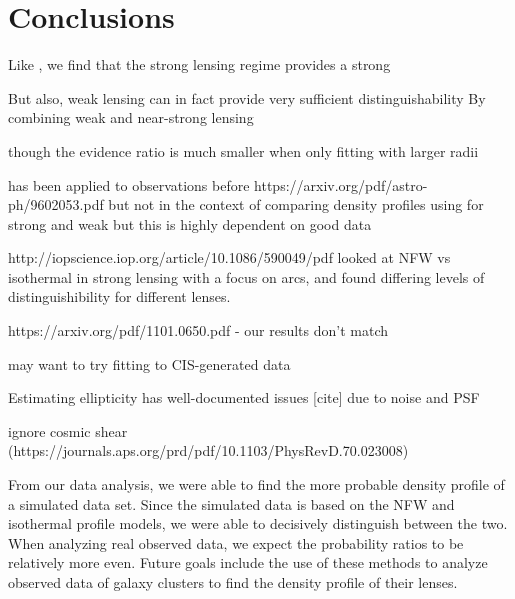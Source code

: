 \documentclass[10pt]{article}
\begin{document}
\section{Conclusions}

Like \citet{Shu2008}, we find that the strong lensing regime provides a strong

But also, weak lensing can in fact provide very sufficient distinguishability
By combining weak and near-strong lensing

though the evidence ratio is much smaller when only fitting with larger radii

has been applied to observations before
https://arxiv.org/pdf/astro-ph/9602053.pdf
but not in the context of comparing density profiles using for strong and weak
but this is highly dependent on good data

http://iopscience.iop.org/article/10.1086/590049/pdf looked at NFW vs isothermal in strong lensing with a focus on arcs, and found differing levels of distinguishibility for different lenses.

https://arxiv.org/pdf/1101.0650.pdf - our results don't match

may want to try fitting to CIS-generated data

Estimating ellipticity has well-documented issues [cite] due to noise and PSF


ignore cosmic shear (https://journals.aps.org/prd/pdf/10.1103/PhysRevD.70.023008)

From our data analysis, we were able to find the more probable density profile of a simulated data set.
Since the simulated data is based on the NFW and isothermal profile models, we were able to decisively distinguish between the two.
When analyzing real observed data, we expect the probability ratios to be relatively more even.
Future goals include the use of these methods to analyze observed data of galaxy clusters to find the density profile of their lenses.





\end{document}
